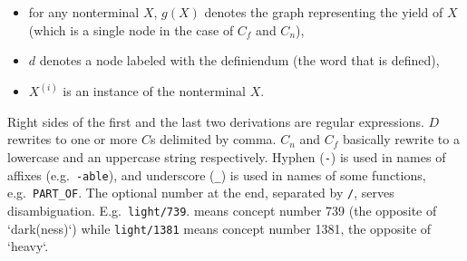 \documentclass[a4paper,10pt]{article}
\begin{document}
\begin{itemize}
 \item for any nonterminal $X$, $g(X)$ denotes the graph representing the yield of $X$ (which is a single node in the case of $C_f$ and $C_n$),
 \item $d$ denotes a node labeled with the definiendum (the word that is defined),
 \item $X^{(i)}$ is an instance of the nonterminal $X$.
\end{itemize}
Right sides of the first and the last two derivations are regular expressions. $D$ rewrites to one or more $C$s delimited by comma. $C_n$ and $C_f$ basically rewrite to a lowercase and an uppercase string respectively. Hyphen (\texttt{-}) is used in names of affixes (e.g.\ \texttt{-able}), and underscore (\texttt{\_}) is used in names of some functions, e.g.\ \texttt{PART\_OF}. The optional number at the end, separated by \texttt{/}, serves disambiguation. E.g.\ \texttt{light/739}.
means concept number 739 (the opposite of `dark(ness)`) while \texttt{light/1381} means concept number 1381, the opposite of `heavy`.
\end{document}
